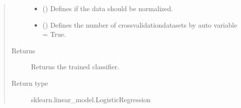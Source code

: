 \documentclass[letterpaper,10pt,english]{sphinxmanual}
\begin{document}
\begin{fulllineitems}
\begin{quote}
\begin{description}
\begin{itemize}
\item {} 
\sphinxAtStartPar
{} (\sphinxstyleliteralemphasis{\sphinxupquote{, }}) \textendash{} Defines if the data should be normalized.

\item {} 
\sphinxAtStartPar
{} (\sphinxstyleliteralemphasis{\sphinxupquote{, }}) \textendash{} Defines the number of cross\sphinxhyphen{}validation\sphinxhyphen{}datasets by auto variable = True.

\end{itemize}

\item[{Returns}] \leavevmode
\sphinxAtStartPar
Returns the trained classifier.

\item[{Return type}] \leavevmode
\sphinxAtStartPar
sklearn.linear\_model.LogisticRegression

\end{description}\end{quote}

\end{fulllineitems}

\end{document}
